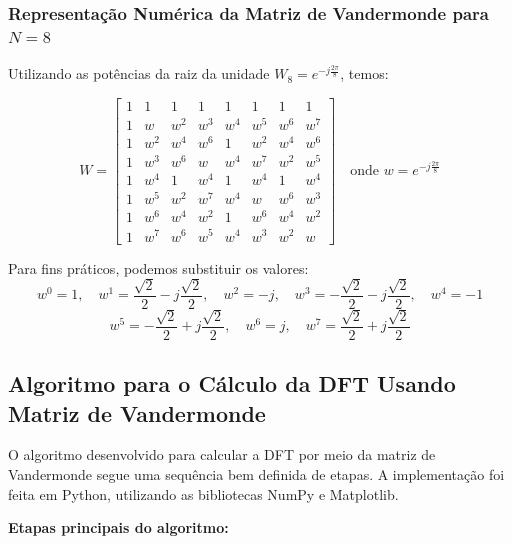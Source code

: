 \documentclass[12pt]{article}
\begin{document}
\subsubsection{Representação Numérica da Matriz de Vandermonde para $N = 8$}

Utilizando as potências da raiz da unidade $W_8 = e^{-j\frac{2\pi}{8}}$, temos:

\[
W =
\begin{bmatrix}
1 & 1 & 1 & 1 & 1 & 1 & 1 & 1 \\
1 & w & w^2 & w^3 & w^4 & w^5 & w^6 & w^7 \\
1 & w^2 & w^4 & w^6 & 1 & w^2 & w^4 & w^6 \\
1 & w^3 & w^6 & w & w^4 & w^7 & w^2 & w^5 \\
1 & w^4 & 1 & w^4 & 1 & w^4 & 1 & w^4 \\
1 & w^5 & w^2 & w^7 & w^4 & w & w^6 & w^3 \\
1 & w^6 & w^4 & w^2 & 1 & w^6 & w^4 & w^2 \\
1 & w^7 & w^6 & w^5 & w^4 & w^3 & w^2 & w
\end{bmatrix}
\quad \text{onde } w = e^{-j\frac{2\pi}{8}}
\]

Para fins práticos, podemos substituir os valores:
\[
w^0 = 1,\quad w^1 = \frac{\sqrt{2}}{2} - j\frac{\sqrt{2}}{2},\quad w^2 = -j,\quad w^3 = -\frac{\sqrt{2}}{2} - j\frac{\sqrt{2}}{2},\quad w^4 = -1
\]
\[
w^5 = -\frac{\sqrt{2}}{2} + j\frac{\sqrt{2}}{2},\quad w^6 = j,\quad w^7 = \frac{\sqrt{2}}{2} + j\frac{\sqrt{2}}{2}
\]



\subsection{Algoritmo para o Cálculo da DFT Usando Matriz de Vandermonde}

O algoritmo desenvolvido para calcular a DFT por meio da matriz de Vandermonde segue uma sequência bem definida de etapas. A implementação foi feita em Python, utilizando as bibliotecas NumPy e Matplotlib.

\textbf{Etapas principais do algoritmo:}
\end{document}
